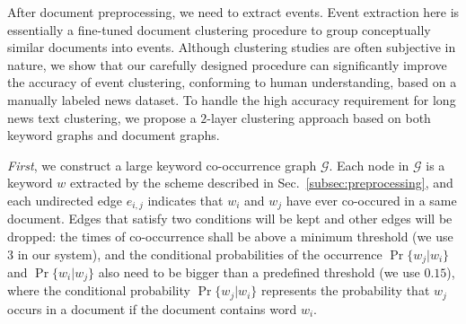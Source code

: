 

		


After document preprocessing, we need to extract events. Event extraction here is essentially a fine-tuned document clustering procedure to group conceptually similar documents into events. Although clustering studies are often subjective in nature, we show that our carefully designed procedure can significantly improve the accuracy of event clustering, conforming to human understanding, based on a manually labeled news dataset.
To handle the high accuracy requirement for long news text clustering, we propose a $2$-layer clustering approach based on both keyword graphs and document graphs.

\textit{First}, we construct a large keyword co-occurrence graph \cite{sayyadi2013graph} $\mathcal{G}$. Each node in $\mathcal{G}$ is a keyword $w$ extracted by the scheme described in Sec.~\ref{subsec:preprocessing}, and each undirected edge $e_{i,j}$ indicates that $w_i$ and $w_j$ have ever co-occured in a same document. 
Edges that satisfy two conditions will be kept and other edges will be dropped: the times of co-occurrence shall be above a minimum threshold (we use $3$ in our system), and the conditional probabilities of the occurrence $\Pr\{w_j| w_i\}$ and $\Pr\{w_i | w_j\}$ also need to be bigger than a predefined threshold (we use $0.15$), where the conditional probability $\Pr\{w_j| w_i\}$ represents the probability that $w_j$ occurs in a document if the document contains word $w_i$.

